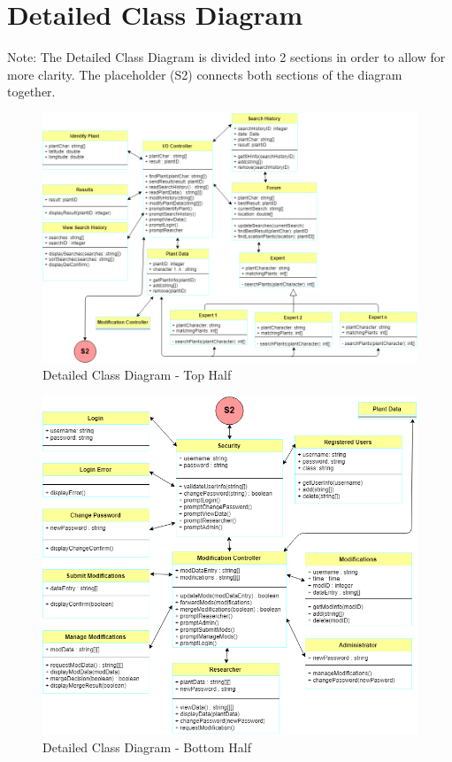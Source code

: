 \documentclass[]{article}
\begin{document}
\section{Detailed Class Diagram}
\label{sec:detailed_class_diagram}
Note: The Detailed Class Diagram is divided into 2 sections in order to allow for more clarity. The placeholder (S2) connects both sections of the diagram together. 
\begin{figure}[!hb]
      \includegraphics[width=\linewidth]{ClassDiagramP1.png}
      \caption{Detailed Class Diagram - Top Half}
      \label{fig:CD1}
\end{figure}
\begin{figure}[!hb]
      \includegraphics[width=\linewidth]{ClassDiagramP2.png}
      \caption{Detailed Class Diagram - Bottom Half}
      \label{fig:CD2}
\end{figure}
\clearpage
\end{document}
